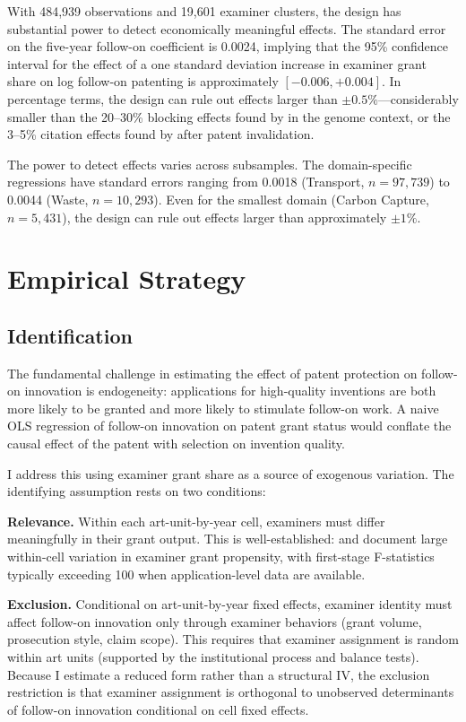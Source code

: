 \documentclass[12pt]{article}
\begin{document}
With 484,939 observations and 19,601 examiner clusters, the design has substantial power to detect economically meaningful effects. The standard error on the five-year follow-on coefficient is 0.0024, implying that the 95\% confidence interval for the effect of a one standard deviation increase in examiner grant share on log follow-on patenting is approximately $[-0.006, +0.004]$. In percentage terms, the design can rule out effects larger than $\pm 0.5\%$---considerably smaller than the 20--30\% blocking effects found by \citet{williams2013} in the genome context, or the 3--5\% citation effects found by \citet{galasso2015} after patent invalidation.

The power to detect effects varies across subsamples. The domain-specific regressions have standard errors ranging from 0.0018 (Transport, $n = 97,739$) to 0.0044 (Waste, $n = 10,293$). Even for the smallest domain (Carbon Capture, $n = 5,431$), the design can rule out effects larger than approximately $\pm 1\%$.


\section{Empirical Strategy}

\subsection{Identification}

The fundamental challenge in estimating the effect of patent protection on follow-on innovation is endogeneity: applications for high-quality inventions are both more likely to be granted and more likely to stimulate follow-on work. A naive OLS regression of follow-on innovation on patent grant status would conflate the causal effect of the patent with selection on invention quality.

I address this using examiner grant share as a source of exogenous variation. The identifying assumption rests on two conditions:

\textbf{Relevance.} Within each art-unit-by-year cell, examiners must differ meaningfully in their grant output. This is well-established: \citet{farremensa2020} and \citet{lemley2012} document large within-cell variation in examiner grant propensity, with first-stage F-statistics typically exceeding 100 when application-level data are available.

\textbf{Exclusion.} Conditional on art-unit-by-year fixed effects, examiner identity must affect follow-on innovation only through examiner behaviors (grant volume, prosecution style, claim scope). This requires that examiner assignment is random within art units (supported by the institutional process and balance tests). Because I estimate a reduced form rather than a structural IV, the exclusion restriction is that examiner assignment is orthogonal to unobserved determinants of follow-on innovation conditional on cell fixed effects.
\end{document}
